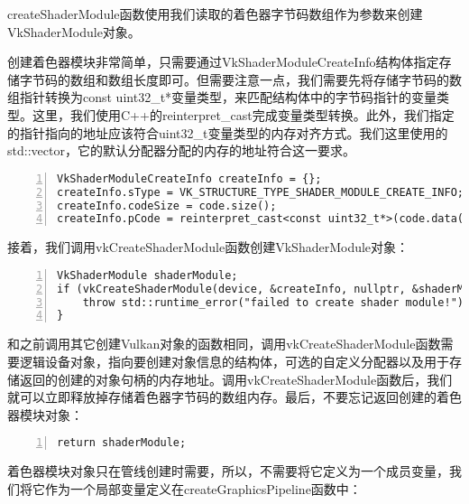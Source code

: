 \documentclass{ctexart}
\begin{document}
createShaderModule函数使用我们读取的着色器字节码数组作为参数来创建VkShaderModule对象。

创建着色器模块非常简单，只需要通过VkShaderModuleCreateInfo结构体指定存储字节码的数组和数组长度即可。但需要注意一点，我们需要先将存储字节码的数组指针转换为const uint32\_t*变量类型，来匹配结构体中的字节码指针的变量类型。这里，我们使用C++的reinterpret\_cast完成变量类型转换。此外，我们指定的指针指向的地址应该符合uint32\_t变量类型的内存对齐方式。我们这里使用的std::vector，它的默认分配器分配的内存的地址符合这一要求。

\begin{lstlisting}[language={[ANSI]C},keywordstyle=\color{blue!70},commentstyle=\color{red!50!green!50!blue!50},frame=shadowbox, rulesepcolor=\color{red!20!green!20!blue!20},basicstyle=\small,numbers=left, numberstyle=\tiny,breaklines=true]
VkShaderModuleCreateInfo createInfo = {};
createInfo.sType = VK_STRUCTURE_TYPE_SHADER_MODULE_CREATE_INFO;
createInfo.codeSize = code.size();
createInfo.pCode = reinterpret_cast<const uint32_t*>(code.data());
\end{lstlisting}

接着，我们调用vkCreateShaderModule函数创建VkShaderModule对象：

\begin{lstlisting}[language={[ANSI]C},keywordstyle=\color{blue!70},commentstyle=\color{red!50!green!50!blue!50},frame=shadowbox, rulesepcolor=\color{red!20!green!20!blue!20},basicstyle=\small,numbers=left, numberstyle=\tiny,breaklines=true]
VkShaderModule shaderModule;
if (vkCreateShaderModule(device, &createInfo, nullptr, &shaderModule) != VK_SUCCESS) {
	throw std::runtime_error("failed to create shader module!");
}
\end{lstlisting}

和之前调用其它创建Vulkan对象的函数相同，调用vkCreateShaderModule函数需要逻辑设备对象，指向要创建对象信息的结构体，可选的自定义分配器以及用于存储返回的创建的对象句柄的内存地址。调用vkCreateShaderModule函数后，我们就可以立即释放掉存储着色器字节码的数组内存。最后，不要忘记返回创建的着色器模块对象：

\begin{lstlisting}[language={[ANSI]C},keywordstyle=\color{blue!70},commentstyle=\color{red!50!green!50!blue!50},frame=shadowbox, rulesepcolor=\color{red!20!green!20!blue!20},basicstyle=\small,numbers=left, numberstyle=\tiny,breaklines=true]
return shaderModule;
\end{lstlisting}

着色器模块对象只在管线创建时需要，所以，不需要将它定义为一个成员变量，我们将它作为一个局部变量定义在createGraphicsPipeline函数中：
\end{document}
